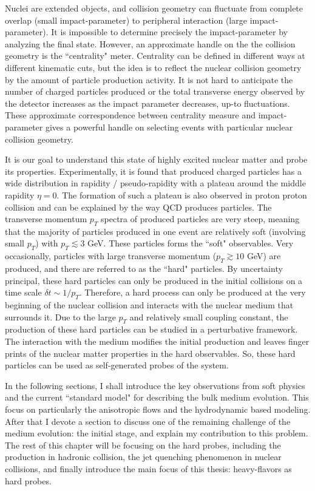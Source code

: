 Nuclei are extended objects, and collision geometry can fluctuate from complete overlap (small impact-parameter) to peripheral interaction (large impact-parameter).
It is impossible to determine precisely the impact-parameter by analyzing the final state. 
However, an approximate handle on the the collision geometry is the ``centrality" meter. 
Centrality can be defined in different ways at different kinematic cuts, but the idea is to reflect the nuclear collision geometry by the amount of particle production activity.
It is not hard to anticipate the number of charged particles produced or the total transverse energy observed by the detector increases as the impact parameter decreases, up-to fluctuations.
These approximate correspondence between centrality measure and impact-parameter gives a powerful handle on selecting events with particular nuclear collision geometry.


It is our goal to understand this state of highly excited nuclear matter and probe its properties.
Experimentally, it is found that produced charged particles has a wide distribution in rapidity / pseudo-rapidity with a plateau around the middle rapidity $\eta = 0$.
The formation of such a plateau is also observed in proton proton collision and can be explained by the way QCD produces particles.
The transverse momentum $p_T$ spectra of produced particles are very steep, meaning that the majority of particles produced in one event are relatively soft (involving small $p_T$) with $p_T \lesssim 3$ GeV.
These particles forms the ``soft" observables. 
Very occasionally, particles with large transverse momentum ($p_T\gtrsim 10$ GeV) are produced, and there are referred to as the ``hard" particles.
By uncertainty principal, these hard particles can only be produced in the initial collisions on a time scale $\delta t \sim 1/p_T$.
Therefore, a hard process can only be produced at the very beginning of the nuclear collision and interacts with the nuclear medium that surrounds it.
Due to the large $p_T$ and relatively small coupling constant, the production of these hard particles can be studied in a perturbative framework.
The interaction with the medium modifies the initial production and leaves finger prints of the nuclear matter properties in the hard observables. 
So, these hard particles can be used as self-generated probes of the system.

In the following sections, I shall introduce the key observations from soft physics and the current ``standard model" for describing the bulk medium evolution.
This focus on particularly the anisotropic flows and the hydrodynamic based modeling.
After that I devote a section to discuss one of the remaining challenge of the medium evolution: the initial stage, and explain my contribution to this problem.
The rest of this chapter will be focusing on the hard probes, including the production in hadronic collision, the jet quenching phenomenon in nuclear collisions, and finally introduce the main focus of this thesis: heavy-flavors as hard probes.

